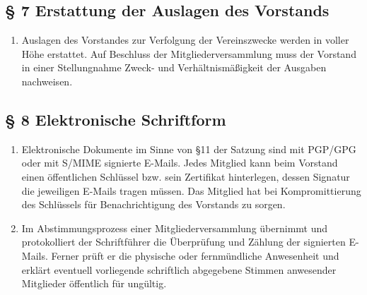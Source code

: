 \documentclass[10pt,a4paper]{article}
\begin{document}
\subsection*{§ 7 Erstattung der Auslagen des Vorstands}
\begin{enumerate}
\item Auslagen des Vorstandes zur Verfolgung der Vereinszwecke werden
    in voller Höhe erstattet. Auf Beschluss der Mitgliederversammlung
    muss der Vorstand in einer Stellungnahme Zweck- und Verhältnis\-mäßigkeit
    der Ausgaben nachweisen.
\end{enumerate}
%
%
\subsection*{§ 8 Elektronische Schriftform}
\begin{enumerate}
\item Elektronische Dokumente im Sinne von §11 der Satzung sind mit PGP/GPG
    oder mit S/MIME signierte E-Mails. Jedes Mitglied kann beim Vorstand
    einen öffentlichen Schlüssel bzw. sein Zertifikat hinterlegen, dessen
    Signatur die jeweiligen E-Mails tragen müssen. Das Mitglied hat bei
    Kompromittierung des Schlüssels für Benachrichtigung des Vorstands
    zu sorgen.
\item Im Abstimmungsprozess einer Mitgliederversammlung
    übernimmt und protokolliert der Schriftführer die Überprüfung und
    Zählung der signierten E-Mails. Ferner prüft er die physische oder fernmündliche Anwesenheit und
    erklärt eventuell vorliegende schriftlich abgegebene Stimmen anwesender
    Mitglieder öffentlich für ungültig.
\end{enumerate}

%
%
\end{document}
